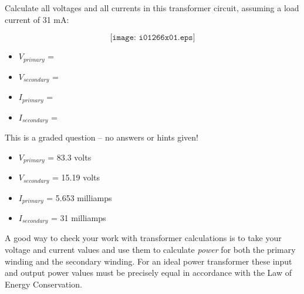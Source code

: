 

Calculate all voltages and all currents in this transformer circuit, assuming a load current of 31 mA:

$$\texttt{[image: i01266x01.eps]}$$

\begin{itemize}
\item{} $V_{primary}$ = 
\item{} $V_{secondary}$ = 
\item{} $I_{primary}$ = 
\item{} $I_{secondary}$ = 
\end{itemize}

\vfil 

\eject






This is a graded question -- no answers or hints given!







\begin{itemize}
\item{} $V_{primary}$ = 83.3 volts
\item{} $V_{secondary}$ = 15.19 volts
\item{} $I_{primary}$ = 5.653 milliamps
\item{} $I_{secondary}$ = 31 milliamps
\end{itemize}

A good way to check your work with transformer calculations is to take your voltage and current values and use them to calculate {\it power} for both the primary winding and the secondary winding.  For an ideal power transformer these input and output power values must be precisely equal in accordance with the Law of Energy Conservation.




